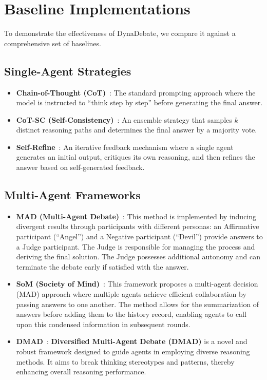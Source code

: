\section{Baseline Implementations}
\label{app:baselines}

To demonstrate the effectiveness of DynaDebate, we compare it against a comprehensive set of baselines.
\vspace{-4pt}
\subsection{Single-Agent Strategies}
\begin{itemize}
    \item \textbf{Chain-of-Thought (CoT)}~\cite{wei2022chain}: The standard prompting approach where the model is instructed to ``think step by step'' before generating the final answer.
    \item \textbf{CoT-SC (Self-Consistency)}~\cite{wang2022self}: An ensemble strategy that samples $k$ distinct reasoning paths and determines the final answer by a majority vote.
    \item \textbf{Self-Refine}~\cite{madaan2023self}: An iterative feedback mechanism where a single agent generates an initial output, critiques its own reasoning, and then refines the answer based on self-generated feedback.
\end{itemize}

\subsection{Multi-Agent Frameworks}
\begin{itemize}
    \item \textbf{MAD (Multi-Agent Debate)}~\cite{liang2023encouraging}: This method is implemented by inducing divergent results through participants with different personas: an Affirmative participant (``Angel'') and a Negative participant (``Devil'') provide answers to a Judge participant. The Judge is responsible for managing the process and deriving the final solution. The Judge possesses additional autonomy and can terminate the debate early if satisfied with the answer.
    \item \textbf{SoM (Society of Mind)}~\cite{du2023improving}: This framework proposes a multi-agent decision (MAD) approach where multiple agents achieve efficient collaboration by passing answers to one another. The method allows for the summarization of answers before adding them to the history record, enabling agents to call upon this condensed information in subsequent rounds.
    \item \textbf{DMAD}~\cite{liu2025breaking}: \textbf{Diversified Multi-Agent Debate (DMAD)} is a novel and robust framework designed to guide agents in employing diverse reasoning methods. It aims to break thinking stereotypes and patterns, thereby enhancing overall reasoning performance.
\end{itemize}
